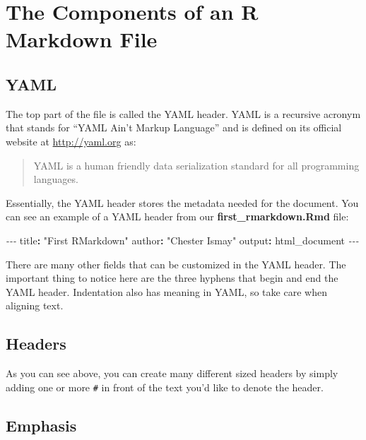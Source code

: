 \documentclass[]{tufte-book}
\newenvironment{Shaded}{\begin{snugshade}}{\end{snugshade}}
\newcommand{\AttributeTok}[1]{\textcolor[rgb]{0.77,0.63,0.00}{#1}}
\newcommand{\FunctionTok}[1]{\textcolor[rgb]{0.00,0.00,0.00}{#1}}
\newcommand{\KeywordTok}[1]{\textcolor[rgb]{0.13,0.29,0.53}{\textbf{#1}}}
\newcommand{\PreprocessorTok}[1]{\textcolor[rgb]{0.56,0.35,0.01}{\textit{#1}}}
\newcommand{\StringTok}[1]{\textcolor[rgb]{0.31,0.60,0.02}{#1}}
\begin{document}
\hypertarget{the-components-of-an-r-markdown-file}{%
\section{The Components of an R Markdown File}\label{the-components-of-an-r-markdown-file}}

\hypertarget{yaml}{%
\subsection{YAML}\label{yaml}}

The top part of the file is called the YAML header. YAML is a recursive acronym that stands for ``YAML Ain't Markup Language'' and is defined on its official website at \url{http://yaml.org} as:

\begin{quote}
YAML is a human friendly data serialization
standard for all programming languages.
\end{quote}

Essentially, the YAML header stores the metadata needed for the document. You can see an example of a YAML header from our \textbf{first\_rmarkdown.Rmd} file:

\begin{Shaded}
\begin{Highlighting}[]
\PreprocessorTok{{-}{-}{-}}
\FunctionTok{title}\KeywordTok{:}\AttributeTok{ }\StringTok{"First RMarkdown"}
\FunctionTok{author}\KeywordTok{:}\AttributeTok{ }\StringTok{"Chester Ismay"}
\FunctionTok{output}\KeywordTok{:}\AttributeTok{ html\_document}
\PreprocessorTok{{-}{-}{-}}
\end{Highlighting}
\end{Shaded}

There are many other fields that can be customized in the YAML header. The important thing to notice here are the three hyphens that begin and end the YAML header. Indentation also has meaning in YAML, so take care when aligning text.

\hypertarget{headers}{%
\subsection{Headers}\label{headers}}

As you can see above, you can create many different sized headers by simply adding one or more \texttt{\#} in front of the text you'd like to denote the header.

\hypertarget{emphasis}{%
\subsection{Emphasis}\label{emphasis}}
\end{document}

